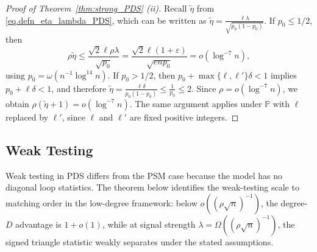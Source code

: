 \documentclass[11pt, letterpaper]{article}
\numberwithin{equation}{section}
\newcommand{\PP}{\mathbb{P}}
\begin{document}
\begin{proof}[Proof of Theorem~\ref{thm:strong_PDS} \textnormal{(ii)}]
Recall $\tilde \eta$ from \eqref{eq.defn_eta_lambda_PDS}, which can be written as $\tilde \eta=\frac{\ell\lambda}{\sqrt{p_0(1-p_0)}}$. If $p_0\le 1/2$, then
\[\rho\tilde\eta \le \frac{\sqrt{2}\ell\rho\lambda}{\sqrt{p_0}}
=\frac{\sqrt{2}\ell(1+\varepsilon)}{\sqrt{enp_0}}=o(\log^{-7}n),
\]
using $p_0=\omega(n^{-1}\log^{14}n)$. If $p_0>1/2$, then
$p_0+\max\{\ell,\ell'\}\delta< 1$ implies $p_0+\ell\delta< 1$, and therefore $\tilde\eta=\frac{\ell\delta}{p_0(1-p_0)}\le \frac1{p_0}\le 2.$ Since $\rho=o(\log^{-7}n)$, we obtain $\rho(\tilde\eta+1)=o(\log^{-7}n)$. The same argument applies under $\PP$ with $\ell$ replaced by $\ell'$, since $\ell$ and $\ell'$ are fixed positive integers. \qedhere
\end{proof}

\subsection{Weak Testing}
Weak testing in PDS differs from the PSM case because the model has no diagonal loop statistics.  The theorem below identifies the weak-testing scale to matching order in the low-degree framework: below
$o((\rho\sqrt n)^{-1})$, the degree-$D$ advantage is $1+o(1)$, while at signal strength $\lambda=\Omega\left((\rho\sqrt n)^{-1}\right)$, the signed triangle statistic weakly separates under the stated assumptions.
\end{document}
